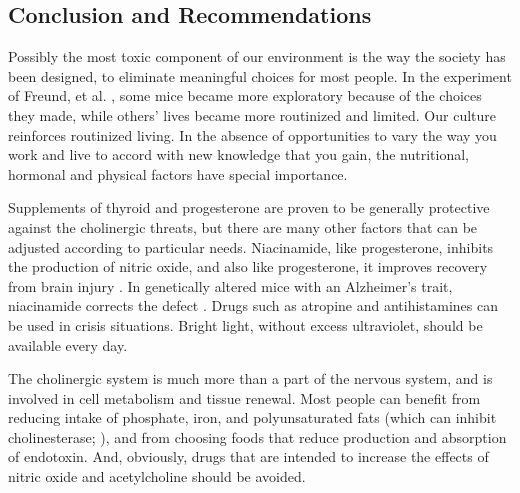 \documentclass{article}
\begin{document}
\subsection{Conclusion and Recommendations}
Possibly the most toxic component of our environment is the way the society has been designed, to eliminate meaningful choices for most people. In the experiment of Freund, et al. \cite{Freund2013}, some mice became more exploratory because of the choices they made, while others' lives became more routinized and limited. Our culture reinforces routinized living. In the absence of opportunities to vary the way you work and live to accord with new knowledge that you gain, the nutritional, hormonal and physical factors have special importance.

Supplements of thyroid and progesterone are proven to be generally protective against the cholinergic threats, but there are many other factors that can be adjusted according to particular needs. Niacinamide, like progesterone, inhibits the production of nitric oxide, and also like progesterone, it improves recovery from brain injury \cite{Hoane2008}. In genetically altered mice with an Alzheimer's trait, niacinamide corrects the defect \cite{Green2008}. Drugs such as atropine and antihistamines can be used in crisis situations. Bright light, without excess ultraviolet, should be available every day.

The cholinergic system is much more than a part of the nervous system, and is involved in cell metabolism and tissue renewal. Most people can benefit from reducing intake of phosphate, iron, and polyunsaturated fats (which can inhibit cholinesterase; \cite{Willis2009}), and from choosing foods that reduce production and absorption of endotoxin. And, obviously, drugs that are intended to increase the effects of nitric oxide and acetylcholine should be avoided.


\newpage

\printbibliography
\end{document}
